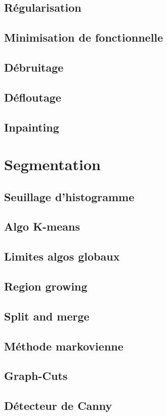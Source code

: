 \documentclass[french]{article}
\begin{document}
\subsection{Régularisation}
\subsection{Minimisation de fonctionnelle}
\subsection{Débruitage}
\subsection{Défloutage}
\subsection{Inpainting}

\section{Segmentation}
\subsection{Seuillage d'histogramme}
\subsection{Algo K-means}
\subsection{Limites algos globaux}
\subsection{Region growing}
\subsection{Split and merge}
\subsection{Méthode markovienne}
\subsection{Graph-Cuts}
\subsection{Détecteur de Canny}
\end{document}
